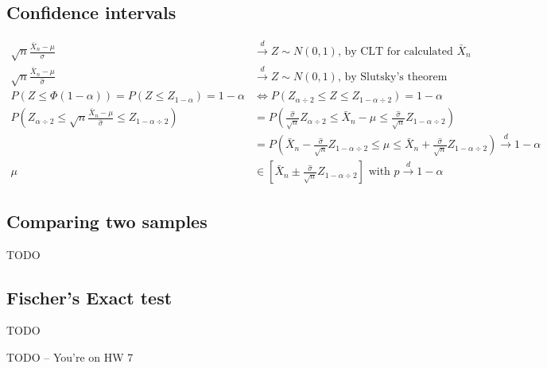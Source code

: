\documentclass{article}
\begin{document}
\subsection{Confidence intervals}
\begin{align*}
    \sqrt{n}\frac{\bar{X}_n - \mu}{\sigma} &\overset{d}{\longrightarrow} Z \sim N(0,1) \textrm{, by CLT for calculated } \bar{X}_n\\
    \sqrt{n}\frac{\bar{X}_n - \mu}{\hat{\sigma}} &\overset{d}{\longrightarrow} Z \sim N(0,1) \textrm{, by Slutsky's theorem}\\
    P(Z \leq \Phi(1-\alpha)) = P(Z \leq Z_{1-\alpha}) = 1-\alpha &\Longleftrightarrow P(Z_{\alpha \div 2} \leq Z \leq Z_{1-\alpha \div 2}) = 1-\alpha\\
    P(Z_{\alpha \div 2} \leq \sqrt{n}\frac{\bar{X}_n - \mu}{\hat{\sigma}} \leq Z_{1-\alpha \div 2}) &= P(\frac{\hat{\sigma}}{\sqrt{n}}Z_{\alpha \div 2} \leq \bar{X}_n - \mu \leq \frac{\hat{\sigma}}{\sqrt{n}}Z_{1-\alpha \div 2})\\
    &= P(\bar{X}_n - \frac{\hat{\sigma}}{\sqrt{n}}Z_{1-\alpha \div 2} \leq \mu \leq \bar{X}_n + \frac{\hat{\sigma}}{\sqrt{n}}Z_{1-\alpha \div 2}) \overset{d}{\longrightarrow} 1-\alpha\\
    \mu &\in \left[\bar{X}_n \pm \frac{\hat{\sigma}}{\sqrt{n}}Z_{1-\alpha \div 2}\right] \textrm{ with } p \overset{d}{\longrightarrow} 1-\alpha
\end{align*}

\subsection{Comparing two samples}
TODO
\subsection{Fischer's Exact test}
TODO

TODO -- You're on HW 7
\end{document}
